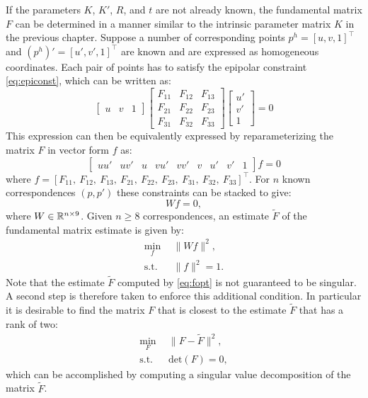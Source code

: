 If the parameters $K$, $K'$, $R$, and $t$ are not already known, the fundamental matrix $F$ can be determined in a manner similar to the intrinsic parameter matrix $K$ in the previous chapter. Suppose a number of corresponding points $p^h = [u, v, 1]^\top $ and $(p^h)'= [u',v',1]^\top $ are known and are expressed as homogeneous coordinates. Each pair of points has to satisfy the epipolar constraint \eqref{eq:epiconst}, which can be written as:
\begin{equation*}
\begin{bmatrix}
u & v & 1
\end{bmatrix} \begin{bmatrix}
F_{11} & F_{12} & F_{13} \\
F_{21} & F_{22} & F_{23} \\
F_{31} & F_{32} & F_{33}
\end{bmatrix} \begin{bmatrix}
u' \\ v' \\ 1
\end{bmatrix} = 0    
\end{equation*}
This expression can then be equivalently expressed by reparameterizing the matrix $F$ in vector form $f$ as:
\begin{equation}
\begin{bmatrix}
uu' & uv' & u & vu' & vv' & v & u' & v' & 1
\end{bmatrix}f = 0
\end{equation}
where $f = [F_{11}, \:F_{12} , \: F_{13}, \:F_{21}, \:F_{22}, \:F_{23}, \:F_{31}, \:F_{32}, \:F_{33}]^\top $. For $n$ known correspondences $(p,p')$ these constraints can be stacked to give:
\begin{equation}
    Wf = 0,
\end{equation}
where $W \in \mathbb{R}^{n \times 9}$.
Given $n \geq 8$ correspondences, an estimate $\tilde{F}$ of the fundamental matrix estimate is given by:
\begin{equation} \label{eq:fopt}
\begin{split}
\min_{f} \:\:& \lVert Wf \rVert^2, \\
\text{s.t.} \:\:& \lVert f \rVert^2 = 1.
\end{split}
\end{equation}
Note that the estimate $\tilde{F}$ computed by \eqref{eq:fopt} is not guaranteed to be singular. A second step is therefore taken to enforce this additional condition. In particular it is desirable to find the matrix $F$ that is closest to the estimate $\tilde{F}$ that has a rank of two:
\begin{equation}
\begin{split}
   \min_F \:\:& \lVert F-\tilde{F}\rVert^2, \\
\text{s.t.} \:\:& \text{det}(F) = 0,
\end{split}
\end{equation}
which can be accomplished by computing a singular value decomposition of the matrix $\tilde{F}$.

